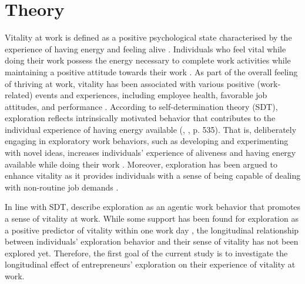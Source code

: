 \documentclass[man, 12pt, a4paper, noextraspace]{apa6}
\begin{document}
\section{Theory}
Vitality at work is defined as a positive psychological state characterised by the experience of having energy \parencite{Nix.1999b} and feeling alive \parencite{Spreitzer.2005b}. 
Individuals who feel vital while doing their work possess the energy necessary to complete work activities while maintaining a positive attitude towards their work \parencite{Ryan.1997}. 
As part of the overall feeling of thriving at work, vitality has been associated with various positive (work‐related) events and experiences, including employee health, favorable job attitudes, and performance \parencite{Kleine.2019}.
According to self-determination theory (SDT), exploration reflects intrinsically motivated behavior that contributes to the individual experience of having energy available (\citeauthor{Ryan.1997}, \citeyear{Ryan.1997}, p. 535). 
That is, deliberately engaging in exploratory work behaviors, such as developing and experimenting with novel ideas, increases individuals' experience of aliveness and having energy available while doing their work \parencite{Spreitzer.2005b}. 
Moreover, exploration has been argued to enhance vitality as it provides individuals with a sense of being capable of dealing with non-routine job demands \parencite{Daniels2009, Niessen.2012}. \par 
In line with SDT, \textcite{Spreitzer.2005b} describe exploration as an agentic work behavior that promotes a sense of vitality at work. 
While some support has been found for exploration as a positive predictor of vitality within one work day \textcite{Niessen.2012}, the longitudinal relationship between individuals' exploration behavior and their sense of vitality has not been explored yet. 
Therefore, the first goal of the current study is to investigate the longitudinal effect of entrepreneurs' exploration on their experience of vitality at work. \par 
\end{document}
